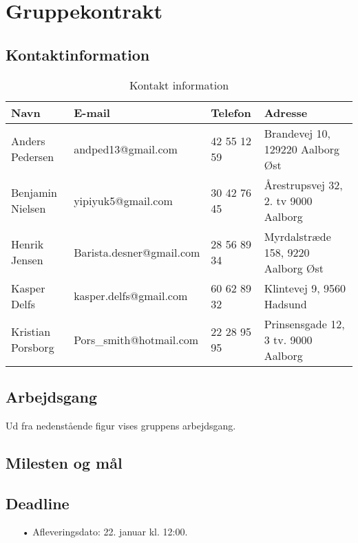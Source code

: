 \section{Gruppekontrakt}
\subsection{Kontaktinformation}
\begin{table}[h]
\centering

\begin{tabular}{|l|l|l|p{4cm}|}
\hline
\rowcolor{lightgray}
Navn			  & E-mail					 & Telefon     & Adresse 							 \\ \hline
Anders Pedersen   & andped13@gmail.com       & 42 55 12 59 & Brandevej 10, 129220 Aalborg Øst    \\ \hline
Benjamin Nielsen  & yipiyuk5@gmail.com       & 30 42 76 45 & Årestrupsvej 32, 2. tv 9000 Aalborg \\ \hline
Henrik Jensen     & Barista.desner@gmail.com & 28 56 89 34 & Myrdalstræde 158, 9220 Aalborg Øst  \\ \hline
Kasper Delfs      & kasper.delfs@gmail.com   & 60 62 89 32 & Klintevej 9, 9560 Hadsund           \\ \hline
Kristian Porsborg & Pors\_smith@hotmail.com  & 22 28 95 95 & Prinsensgade 12, 3 tv. 9000 Aalborg \\ \hline
\end{tabular}
\caption{Kontakt information}
\label{kontaktinformation}
\end{table}

\subsection{Arbejdsgang}
Ud fra nedenstående figur vises gruppens arbejdsgang. 

\subsection{Milesten og mål}

\subsection{Deadline}
\begin{enumerate}
	\item[•]Afleveringsdato: 22. januar kl. 12:00.
\end{enumerate}
